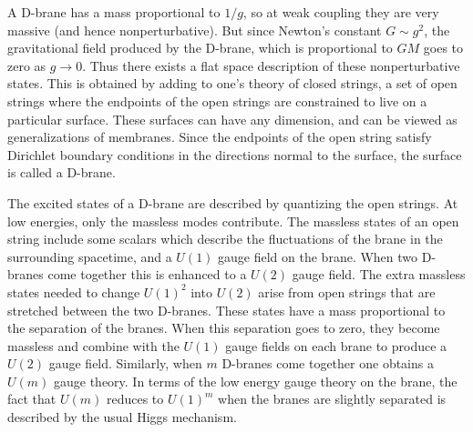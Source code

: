 A D-brane has a mass proportional to $1/g$, so at weak coupling they
are very massive (and hence nonperturbative). But since Newton's constant
$G\sim g^2$, the gravitational field produced by the D-brane, which
is proportional to  $GM$ goes to 
zero as $g\rightarrow 0$. Thus there exists a flat space description of
these nonperturbative states. This is obtained by adding
to one's theory of closed
strings, a set of open strings where the endpoints of the open strings
are constrained to live on a  particular surface. These surfaces can have
any dimension, and can be viewed as generalizations of membranes.
Since the endpoints
of the open string satisfy Dirichlet boundary conditions in the directions
normal to the surface, the surface is called a D-brane. 

The excited states of a D-brane are described by quantizing the
open strings. At low energies, only the massless modes contribute.  The massless
states of an open string include some scalars which describe the fluctuations
of the brane in the surrounding spacetime, and a $U(1)$ gauge field on the
brane.
When two D-branes
come together this is enhanced to a $U(2)$ gauge field. The extra
massless states needed to change $U(1)^2$ into $U(2)$
arise from open strings that are stretched between
the two D-branes. These states have a mass proportional to the
separation of the branes. When this separation goes to zero, they become
massless and combine
with the $U(1)$ gauge fields on each brane to produce a $U(2)$ gauge field.
Similarly, when $m$ D-branes come together one obtains a $U(m)$ gauge
theory.  
In terms of the low energy gauge theory on the brane, the fact that
$U(m)$ reduces to $U(1)^m$ when the branes are slightly separated 
is described by the usual Higgs mechanism. 


